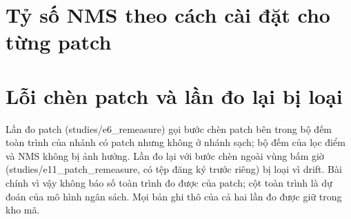 \documentclass[11pt,a4paper]{article}
\begin{document}


\section{Tỷ số NMS theo cách cài đặt cho từng patch}


\section{Lỗi chèn patch và lần đo lại bị loại}
Lần đo patch (studies/e6\_remeasure) gọi bước chèn patch bên trong bộ đếm toàn trình của nhánh có patch nhưng không ở nhánh sạch; bộ đếm của lọc điểm và NMS không bị ảnh hưởng. Lần đo lại với bước chèn ngoài vùng bấm giờ (studies/e11\_patch\_remeasure, có tệp đăng ký trước riêng) bị loại vì drift. Bài chính vì vậy không báo số toàn trình đo được của patch; cột toàn trình là dự đoán của mô hình ngân sách. Mọi bản ghi thô của cả hai lần đo được giữ trong kho mã.
\end{document}
